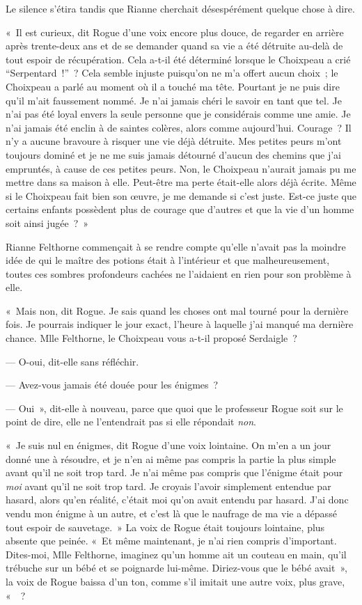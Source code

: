 Le silence s'étira tandis que Rianne cherchait désespérément quelque chose à dire.

«~Il est curieux, dit Rogue d'une voix encore plus douce, de regarder en arrière après trente-deux ans et de se demander quand sa vie a été détruite au-delà de tout espoir de récupération. Cela a-t-il été déterminé lorsque le Choixpeau a crié “Serpentard~!”~? Cela semble injuste puisqu'on ne m'a offert aucun choix~; le Choixpeau a parlé au moment où il a touché ma tête. Pourtant je ne puis dire qu'il m'ait faussement nommé. Je n'ai jamais chéri le savoir en tant que tel. Je n'ai pas été loyal envers la seule personne que je considérais comme une amie. Je n'ai jamais été enclin à de saintes colères, alors comme aujourd'hui. Courage~? Il n'y a aucune bravoure à risquer une vie déjà détruite. Mes petites peurs m'ont toujours dominé et je ne me suis jamais détourné d'aucun des chemins que j'ai empruntés, à cause de ces petites peurs. Non, le Choixpeau n'aurait jamais pu me mettre dans sa maison à elle. Peut-être ma perte était-elle alors déjà écrite. Même si le Choixpeau fait bien son œuvre, je me demande si c'est juste. Est-ce juste que certains enfants possèdent plus de courage que d'autres et que la vie d'un homme soit ainsi jugée~?~»

Rianne Felthorne commençait à se rendre compte qu'elle n'avait pas la moindre idée de qui le maître des potions était à l'intérieur et que malheureusement, toutes ces sombres profondeurs cachées ne l'aidaient en rien pour son problème à elle.

«~Mais non, dit Rogue. Je sais quand les choses ont mal tourné pour la dernière fois. Je pourrais indiquer le jour exact, l'heure à laquelle j'ai manqué ma dernière chance. Mlle Felthorne, le Choixpeau vous a-t-il proposé Serdaigle~?

--- O-oui, dit-elle sans réfléchir.

--- Avez-vous jamais été douée pour les énigmes~?

--- Oui~», dit-elle à nouveau, parce que quoi que le professeur Rogue soit sur le point de dire, elle ne l'entendrait pas si elle répondait \emph{non}.

«~Je suis nul en énigmes, dit Rogue d'une voix lointaine. On m'en a un jour donné une à résoudre, et je n'en ai même pas compris la partie la plus simple avant qu'il ne soit trop tard. Je n'ai même pas compris que l'énigme était pour \emph{moi} avant qu'il ne soit trop tard. Je croyais l'avoir simplement entendue par hasard, alors qu'en réalité, c'était moi qu'on avait entendu par hasard. J'ai donc vendu mon énigme à un autre, et c'est là que le naufrage de ma vie a dépassé tout espoir de sauvetage.~» La voix de Rogue était toujours lointaine, plus absente que peinée. «~Et même maintenant, je n'ai rien compris d'important. Dites-moi, Mlle Felthorne, imaginez qu'un homme ait un couteau en main, qu'il trébuche sur un bébé et se poignarde lui-même. Diriez-vous que le bébé avait~», la voix de Rogue baissa d'un ton, comme s'il imitait une autre voix, plus grave, «~~?

